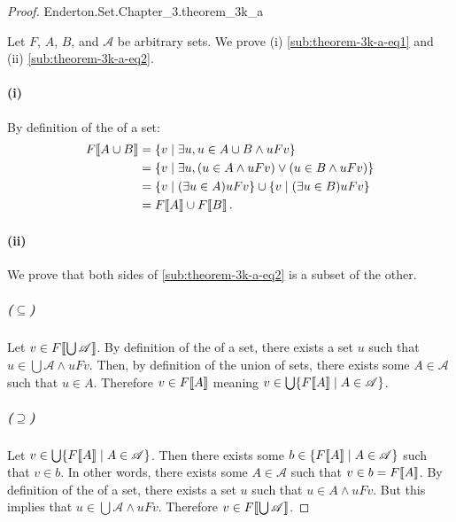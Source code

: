 \documentclass{report}
\begin{document}
\begin{proof}

    {Enderton.Set.Chapter\_3.theorem\_3k\_a}

  Let $F$, $A$, $B$, and $\mathscr{A}$ be arbitrary sets.
  We prove (i) \eqref{sub:theorem-3k-a-eq1} and (ii)
    \eqref{sub:theorem-3k-a-eq2}.

  \paragraph{(i)}%

    By definition of the  of a set:
      \begin{align*}
        F\!\left\llbracket A \cup B\right\rrbracket
          & = \{v \mid \exists u, u \in A \cup B \land uFv\} \\
          & = \{v \mid \exists u,
            (u \in A \land uFv) \lor (u \in B \land uFv)\} \\
          & = \{v \mid (\exists u \in A) uFv\} \cup
            \{v \mid (\exists u \in B) uFv\} \\
          & = F\!\left\llbracket A\right\rrbracket \cup F\!\left\llbracket B\right\rrbracket.
      \end{align*}

  \paragraph{(ii)}%

    We prove that both sides of \eqref{sub:theorem-3k-a-eq2} is a subset of the
      other.

    \subparagraph{($\subseteq$)}%

      Let $v \in F\!\left\llbracket\bigcup{\mathscr{A}}\right\rrbracket$.
      By definition of the  of a set, there exists a set $u$
        such that $u \in \bigcup{\mathscr{A}} \land uFv$.
      Then, by definition of the union of sets, there exists some
        $A \in \mathscr{A}$ such that $u \in A$.
      Therefore $v \in F\!\left\llbracket A\right\rrbracket$ meaning
        $v \in \bigcup\{F\!\left\llbracket A\right\rrbracket \mid A \in \mathscr{A}\}$.

    \subparagraph{($\supseteq$)}%

      Let $v \in \bigcup\{F\!\left\llbracket A\right\rrbracket \mid A \in \mathscr{A}\}$.
      Then there exists some $b \in \{F\!\left\llbracket A\right\rrbracket \mid A \in \mathscr{A}\}$ such
        that $v \in b$.
      In other words, there exists some $A \in \mathscr{A}$ such that
        $v \in b = F\!\left\llbracket A\right\rrbracket$.
      By definition of the  of a set, there exists a set $u$
        such that $u \in A \land uFv$.
      But this implies that $u \in \bigcup{\mathscr{A}} \land uFv$.
      Therefore $v \in F\!\left\llbracket\bigcup{\mathscr{A}}\right\rrbracket$.

\end{proof}
\end{document}

